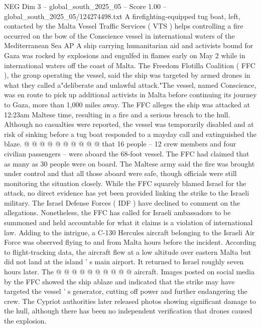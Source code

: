 \begin{textsample}{NEG Dim 3 – global\_south\_2025\_05 – Score 1.00 – global\_south\_2025\_05/124274498.txt}  \label{ex:f3_neg_225}
A firefighting-equipped tug boat, left, contacted by the Malta Vessel Traffic Services ( VTS ) helps controlling a fire occurred on the bow of the Conscience vessel in international waters of the Mediterranean Sea AP A ship carrying humanitarian aid and activists bound for Gaza was rocked by explosions and engulfed in flames early on May 2 while in international waters off the coast of Malta.
The Freedom Flotilla Coalition ( FFC ), the group operating the vessel, said the ship was targeted by armed drones in what they called a"deliberate and unlawful attack."The vessel, named Conscience, was en route to pick up additional activists in Malta before continuing its journey to Gaza, more than 1,000 miles away.
The FFC alleges the ship was attacked at 12:23am Maltese time, resulting in a fire and a serious breach to the hull.
Although no casualties were reported, the vessel was temporarily disabled and at risk of sinking before a tug boat responded to a mayday call and extinguished the blaze. @ @ @ @ @ @ @ @ @ @ that 16 people -- 12 crew members and four civilian passengers -- were aboard the 68-foot vessel.
The FFC had claimed that as many as 30 people were on board.
The Maltese army said the fire was brought under control and that all those aboard were safe, though officials were still monitoring the situation closely.
While the FFC squarely blamed Israel for the attack, no direct evidence has yet been provided linking the strike to the Israeli military.
The Israel Defense Forces ( IDF ) have declined to comment on the allegations.
Nonetheless, the FFC has called for Israeli ambassadors to be summoned and held accountable for what it claims is a violation of international law.
Adding to the intrigue, a C-130 Hercules aircraft belonging to the Israeli Air Force was observed flying to and from Malta hours before the incident.
According to flight-tracking data, the aircraft flew at a low altitude over eastern Malta but did not land at the island ' s main airport.
It returned to Israel roughly seven hours later.
The @ @ @ @ @ @ @ @ @ @ aircraft.
Images posted on social media by the FFC showed the ship ablaze and indicated that the strike may have targeted the vessel ' s generator, cutting off power and further endangering the crew.
The Cypriot authorities later released photos showing significant damage to the hull, although there has been no independent verification that drones caused the explosion.

\end{textsample}
